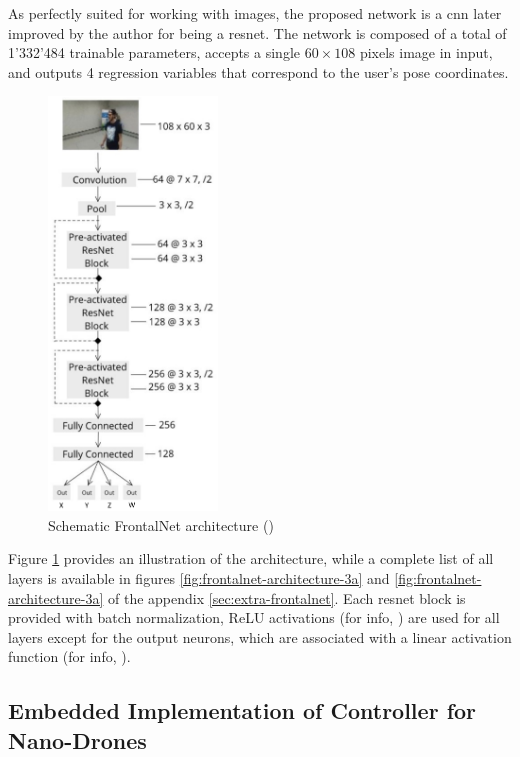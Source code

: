 As perfectly suited for working with images, the proposed network is a \gls{cnn} later improved by the author for being a \gls{resnet}. The network is composed of a total of 1'332'484 trainable parameters, accepts a single $60 \times 108$ pixels image in input, and outputs 4 regression variables that correspond to the user's pose coordinates.

\begin{figure}[!h]
	\centering
	\includegraphics[width=0.4\textwidth]{"contents/images/03-frontalnet-1A"}
	\caption[Schematic FrontalNet architecture]{Schematic FrontalNet architecture (\cite{mantegazza2019visionbased})}
	\label{fig:frontalnet-architecture-1}
\end{figure}

Figure \ref{fig:frontalnet-architecture-1} provides an illustration of the architecture, while a complete list of all layers is available in figures \ref{fig:frontalnet-architecture-3a} and \ref{fig:frontalnet-architecture-3a} of the appendix \ref{sec:extra-frontalnet}. Each \gls{resnet} block is provided with batch normalization, ReLU activations (for info, \cite{act-relu}) are used for all layers except for the output neurons, which are associated with a linear activation function (for info, \cite{act-linear}). 



\subsection{Embedded Implementation of Controller for Nano-Drones}
\label{subsec:sota-nicky}

